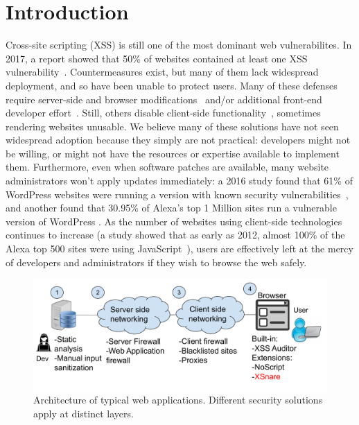 \section{Introduction} \label{introduction}

Cross-site scripting (XSS) is still one of the most dominant web
vulnerabilites. In 2017, a report showed that 50\% of websites
contained at least one XSS vulnerability~\cite{Acunetix}. Countermeasures
exist, but many of them lack widespread deployment, and so have been unable to protect users.
Many of these defenses require server-side and browser modifications~\cite{Jim:2007:DSI:1242572.1242654,Nadji:2009,Wurzinger:2009:SMX:1656360.1656379,10.1007/978-3-642-31540-4_17} and/or additional front-end developer effort~\cite{10.1007/978-3-319-66399-9_7}. Still, others disable client-side
functionality~\cite{Noscript,Snyder:2017:MWD:3133956.3133966},
sometimes rendering websites unusable. We believe many of these
solutions have not seen widespread adoption because they simply are
not practical: developers might not be willing, or might not have the
resources or expertise available to implement them. Furthermore, even
when software patches are available, many website
administrators won't apply updates immediately: a 2016 study found that
61\% of WordPress websites were running a version with known security
vulnerabilities~\cite{Sucuri}, and another found that 30.95\% of
Alexa's top 1 Million sites run a vulnerable version of WordPress
\cite{wpwhitesecurity}. As the number of websites using client-side
technologies continues to increase (a study showed that as early as
2012, almost 100\% of the Alexa top 500 sites were using
JavaScript~\cite{Stock:2017:WTI:3241189.3241265}), users are effectively left at
the mercy of developers and administrators if they wish to browse the
web safely.


\begin{figure}[h]
  \includegraphics[scale=0.37]{img/web_app_architecture_one.pdf}
  \vspace*{-5.0ex}
  \caption{Architecture of typical web applications. Different security solutions apply at distinct layers.}
  \label{fig:web_architecture}
\end{figure}

